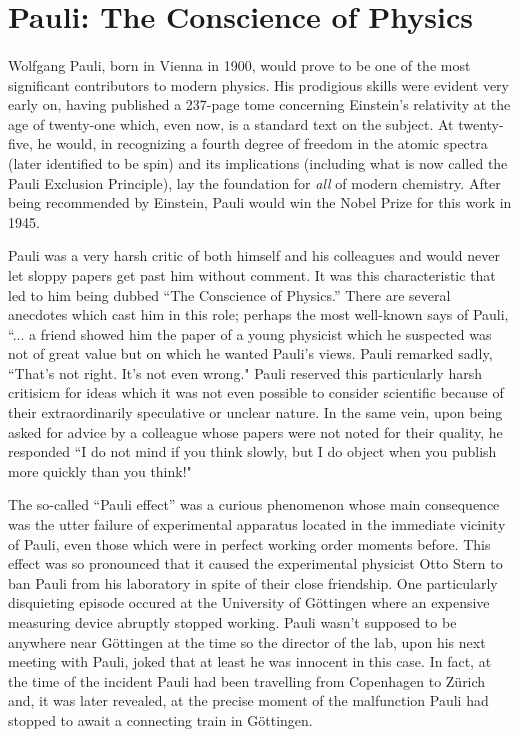\documentclass[a4paper,12pt]{book}
\begin{document}
\section{Pauli: The Conscience of Physics}

\paragraph*{}Wolfgang Pauli, born in Vienna in 1900, would prove to be one of the most significant contributors to modern physics. His prodigious skills were evident very early on, having published a 237-page tome concerning Einstein's relativity at the age of twenty-one which, even now, is a standard text on the subject. At twenty-five, he would, in recognizing a fourth degree of freedom in the atomic spectra (later identified to be spin) and its implications (including what is now called the Pauli Exclusion Principle), lay the foundation for \emph{all} of modern chemistry. After being recommended by Einstein, Pauli would win the Nobel Prize for this work in 1945.

Pauli was a very harsh critic of both himself and his colleagues and would never let sloppy papers get past him without comment. It was this characteristic that led to him being dubbed ``The Conscience of Physics.'' There are several anecdotes which cast him in this role; perhaps the most well-known says of Pauli, ``... a friend showed him the paper of a young physicist which he suspected was not of great value but on which he wanted Pauli's views. Pauli remarked sadly, ``That's not right. It's not even wrong.\cite{peierls}" Pauli reserved this particularly harsh critisicm for ideas which it was not even possible to consider scientific because of their extraordinarily speculative or unclear nature. In the same vein, upon being asked for advice by a colleague whose papers were not noted for their quality, he responded ``I do not mind if you think slowly, but I do object when you publish more quickly than you think!\cite{cropper}"

The so-called ``Pauli effect'' was a curious phenomenon whose main consequence was the utter failure of  experimental apparatus located in the immediate vicinity of Pauli, even those which were in perfect working order moments before. This effect was so pronounced that it caused the experimental physicist Otto Stern to ban Pauli from his laboratory in spite of their close friendship. One particularly disquieting episode occured at the University of G\"{o}ttingen where an expensive measuring device abruptly stopped working. Pauli wasn't supposed to be anywhere near G\"{o}ttingen at the time so the director of the lab, upon his next meeting with Pauli, joked that at least he was innocent in this case. In fact, at the time of the incident Pauli had been travelling from Copenhagen to Z\"{u}rich and, it was later revealed, at the precise moment of the malfunction Pauli had stopped to await a connecting train in G\"{o}ttingen\cite{enz}.
\end{document}

